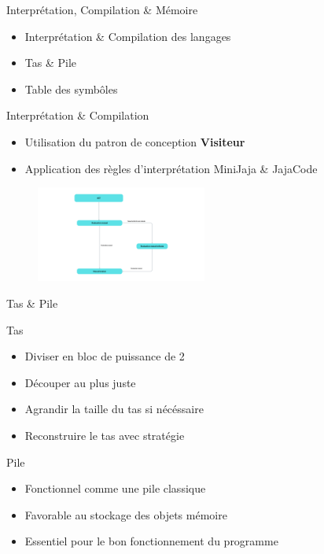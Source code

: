 \begin{chapter}{}{Interprétation, Compilation \& Mémoire}
    \begin{itemize}
          \item Interprétation \& Compilation des langages
          \item Tas \& Pile
          \item Table des symbôles
    \end{itemize}
\end{chapter}

\begin{frame}{Interprétation \& Compilation}
    \begin{block}{}
        \begin{itemize}
            \item Utilisation du patron de conception \textbf{Visiteur}
            \item Application des règles d'interprétation MiniJaja \& JajaCode
        \end{itemize}
    \end{block}
    \begin{figure}
        \centering
        \includegraphics[width=0.5\textwidth]{contents/images/jjtAccept.png}
    \end{figure}
\end{frame}

\begin{frame}{Tas \& Pile}
    \begin{block}{Tas}
        \begin{itemize}
            \item Diviser en bloc de puissance de 2
            \item Découper au plus juste
            \item Agrandir la taille du tas si nécéssaire
            \item Reconstruire le tas avec stratégie
        \end{itemize}
    \end{block}

    \begin{block}{Pile}
        \begin{itemize}
            \item Fonctionnel comme une pile classique
            \item Favorable au stockage des objets mémoire
            \item Essentiel pour le bon fonctionnement du programme
        \end{itemize}
    \end{block}
\end{frame}

